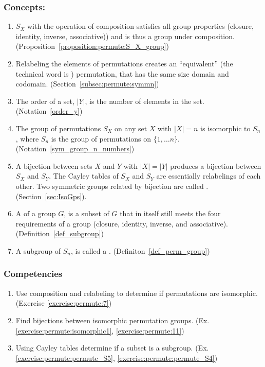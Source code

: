 \subsubsection*{Concepts:}
\begin{enumerate}
\item
$S_X$ with the operation of composition satisfies all group properties  (closure, identity, inverse, associative)) and is thus a group under composition.  (Proposition~\ref{proposition:permute:S_X_group})
\item
Relabeling the elements of permutations creates an ``equivalent'' (the technical word is ) permutation, that has the same size domain and codomain. (Section~\ref{subsec:permute:symmn})
\item
The order of a set, $|Y|$, is the number of elements in the set. (Notation~\ref{order_y})
\item
The group of permutations  $S_X$ on any set $X$ with $|X|=n$ is isomorphic to $S_n$, where $S_n$ is the group of permutations on $\{1,\ldots n\}$. (Notation~\ref{sym_group_n_numbers})
\item
A  bijection between sets $X$ and $Y$ with $|X|=|Y|$ produces a bijection between $S_X$ and $S_Y$. The Cayley tables of $S_X$ and $S_Y$ are essentially relabelings of each other.   Two symmetric groups related by bijection are called . (Section~\ref{sec:IsoGps}).  
\item
A  of a group $G$, is a subset of $G$ that in itself still meets the four requirements of a group (closure, identity, inverse, and associative). (Definition~\ref{def_subgroup})
\item
A subgroup of $S_n$,  is called a . (Definiton~\ref{def_perm_group})
\end{enumerate}

\subsubsection*{Competencies}
\begin{enumerate}
\item
Use composition and relabeling to determine if permutations are isomorphic. (Exercise \ref{exercise:permute:7})
\item
Find bijections between isomorphic permutation groups. (Ex. \ref{exercise:permute:isomorphic1}, \ref{exercise:permute:11})
\item
Using Cayley tables determine if a subset is a subgroup.  (Ex. \ref{exercise:permute:permute_S5}, \ref{exercise:permute:permute_S4})
\end{enumerate}


